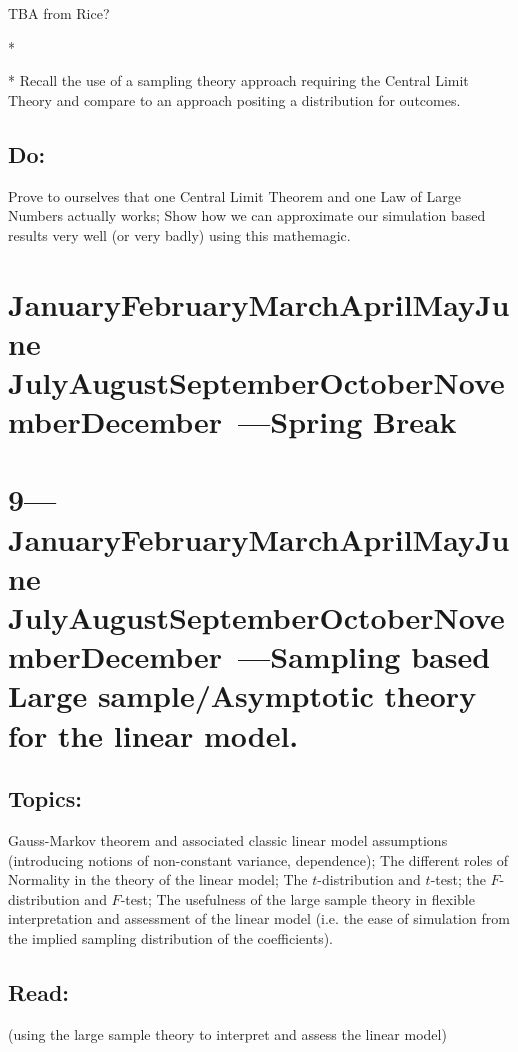 \documentclass[10pt]{article}
\def\themonth{\ifcase\month\or
  January\or February\or March\or April\or May\or June\or
  July\or August\or September\or October\or November\or December\fi}
\begin{document}
TBA from Rice?

*\citealp[Chap 8]{trosset2009isi}

*\citealp[Chap 2.7--2.8]{lohr:1999} Recall the use of a sampling
theory approach requiring the Central Limit Theory and compare to an approach
positing a distribution for outcomes.

\subsection{Do:} Prove to ourselves that one Central Limit Theorem and
one Law of Large Numbers actually works; Show how we can approximate
our simulation based results very well (or very badly) using this mathemagic.

\SetDate[21/03/2011]
\section{\themonth~\the\day---Spring Break}

\SetDate[28/03/2011]
\section{9---\themonth~\the\day---Sampling based Large sample/Asymptotic theory
  for the linear model.}

\subsection{Topics:} Gauss-Markov theorem and associated classic
linear model assumptions (introducing notions of non-constant
variance, dependence); The different roles of Normality in the theory
of the linear model; The $t$-distribution and $t$-test; the
$F$-distribution and $F$-test; The usefulness of the large sample
theory in flexible interpretation and assessment of the linear model
(i.e. the ease of simulation from the implied sampling distribution of
the coefficients).

\subsection{Read:}
\citealp[Chap 6,9]{fox2008applied} 

\citealp{achen82}

\citealp[Chapter 4,6]{berk04}

\citealp[Chap 7]{gelman2007dau} (using the large sample theory to
interpret and assess the linear model)
\end{document}
